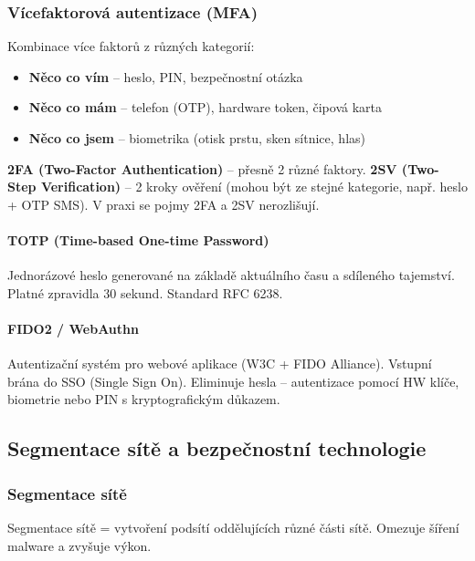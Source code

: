 \subsubsection{Vícefaktorová autentizace (MFA)}

Kombinace více faktorů z různých kategorií:
\begin{itemize}
  \item \textbf{Něco co vím} -- heslo, PIN, bezpečnostní otázka
  \item \textbf{Něco co mám} -- telefon (OTP), hardware token, čipová karta
  \item \textbf{Něco co jsem} -- biometrika (otisk prstu, sken sítnice, hlas)
\end{itemize}

\textbf{2FA (Two-Factor Authentication)} -- přesně 2 různé faktory.
\textbf{2SV (Two-Step Verification)} -- 2 kroky ověření (mohou být ze stejné kategorie, např. heslo + OTP SMS).
V praxi se pojmy 2FA a 2SV nerozlišují.

\paragraph{TOTP (Time-based One-time Password)}
Jednorázové heslo generované na základě aktuálního času a sdíleného tajemství.
Platné zpravidla 30 sekund. Standard RFC 6238.

\paragraph{FIDO2 / WebAuthn}
Autentizační systém pro webové aplikace (W3C + FIDO Alliance). Vstupní brána do SSO (Single Sign On).
Eliminuje hesla -- autentizace pomocí HW klíče, biometrie nebo PIN s kryptografickým důkazem.

\subsection{Segmentace sítě a bezpečnostní technologie}

\subsubsection{Segmentace sítě}

Segmentace sítě = vytvoření podsítí oddělujících různé části sítě. Omezuje šíření malware a zvyšuje výkon.

